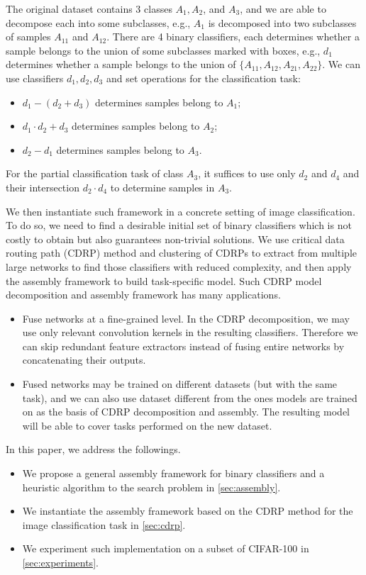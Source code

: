 \documentclass[sigplan,10pt,review]{acmart}\settopmatter{printfolios=true,printccs=false,printacmref=false}
\begin{document}
The original dataset contains 3 classes $A_1, A_2$, and $A_3$, and we are able to decompose each into some subclasses, e.g., $A_1$ is decomposed into two subclasses of samples $A_{11}$ and $A_{12}$.
There are 4 binary classifiers, each determines whether a sample belongs to the union of some subclasses marked with boxes, e.g., $d_1$ determines whether a sample belongs to the union of $\{A_{11}, A_{12}, A_{21}, A_{22}\}$.
We can use classifiers $d_1, d_2, d_3$ and set operations for the classification task:
\begin{itemize}
	\item $d_1 - (d_2 + d_3)$ determines samples belong to $A_1$;
	\item $d_1 \cdot d_2 + d_3$ determines samples belong to $A_2$;
	\item $d_2 - d_1$ determines samples belong to $A_3$.
\end{itemize}
For the partial classification task of class $A_3$, it suffices to use only $d_2$ and $d_4$ and their intersection $d_2 \cdot d_4$ to determine samples in $A_3$.

We then instantiate such framework in a concrete setting of image classification.
To do so, we need to find a desirable initial set of binary classifiers which is not costly to obtain but also guarantees non-trivial solutions.
We use critical data routing path (CDRP) method \cite{wang2018interpret} and clustering of CDRPs to extract from multiple large networks to find those classifiers with reduced complexity, and then apply the assembly framework to build task-specific model.
Such CDRP model decomposition and assembly framework has many applications.
\begin{itemize}
	\item Fuse networks at a fine-grained level.
	In the CDRP decomposition, we may use only relevant convolution kernels in the resulting classifiers.
	Therefore we can skip redundant feature extractors instead of fusing entire networks by concatenating their outputs.
	\item Fused networks may be trained on different datasets (but with the same task), and we can also use dataset different from the ones models are trained on as the basis of CDRP decomposition and assembly.
	The resulting model will be able to cover tasks performed on the new dataset.
\end{itemize}

In this paper, we address the followings.
\begin{itemize}
	\item We propose a general assembly framework for binary classifiers and a heuristic algorithm to the search problem in \cref{sec:assembly}.
	\item We instantiate the assembly framework based on the CDRP method for the image classification task in \cref{sec:cdrp}.
	\item We experiment such implementation on a subset of CIFAR-100 in \cref{sec:experiments}.
\end{itemize}
\end{document}
